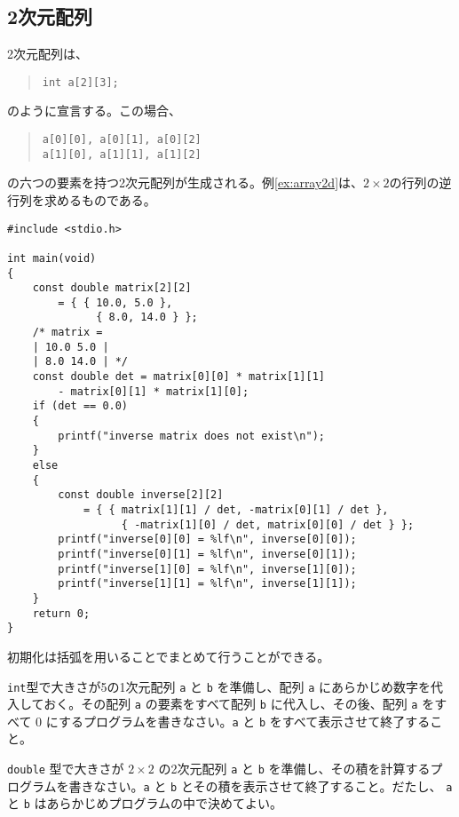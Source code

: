 \subsection{2次元配列}
2次元配列は、
\begin{quote}
    \begin{verbatim}
int a[2][3];
\end{verbatim}
\end{quote}
のように宣言する。この場合、
\begin{quote}
    \begin{verbatim}
a[0][0], a[0][1], a[0][2]
a[1][0], a[1][1], a[1][2]
\end{verbatim}
\end{quote}
の六つの要素を持つ2次元配列が生成される。例\ref{ex:array2d}は、\(2 \times 2\)の行列の逆行列を求めるものである。
\begin{reidai}\label{ex:array2d}
    \begin{verbatim}
#include <stdio.h>

int main(void)
{
    const double matrix[2][2]
        = { { 10.0, 5.0 },
              { 8.0, 14.0 } };
    /* matrix =
    | 10.0 5.0 |
    | 8.0 14.0 | */
    const double det = matrix[0][0] * matrix[1][1]
        - matrix[0][1] * matrix[1][0];
    if (det == 0.0)
    {
        printf("inverse matrix does not exist\n");
    }
    else
    {
        const double inverse[2][2]
            = { { matrix[1][1] / det, -matrix[0][1] / det },
                  { -matrix[1][0] / det, matrix[0][0] / det } };
        printf("inverse[0][0] = %lf\n", inverse[0][0]);
        printf("inverse[0][1] = %lf\n", inverse[0][1]);
        printf("inverse[1][0] = %lf\n", inverse[1][0]);
        printf("inverse[1][1] = %lf\n", inverse[1][1]);
    }
    return 0;
}
\end{verbatim}
\end{reidai}
初期化は括弧を用いることでまとめて行うことができる。

\begin{renshuu}\label{prob:3-1}
    \texttt{int}型で大きさが5の1次元配列 \texttt{a} と \texttt{b} を準備し、配列 \texttt{a} にあらかじめ数字を代入しておく。その配列 \texttt{a} の要素をすべて配列 \texttt{b} に代入し、その後、配列 \texttt{a} をすべて 0 にするプログラムを書きなさい。\texttt{a} と \texttt{b} をすべて表示させて終了すること。
\end{renshuu}

\begin{renshuu}\label{prob:3-2}
    \texttt{double} 型で大きさが \(2\times2\) の2次元配列 \texttt{a} と \texttt{b} を準備し、その積を計算するプログラムを書きなさい。\texttt{a} と \texttt{b} とその積を表示させて終了すること。だたし、 \texttt{a} と \texttt{b} はあらかじめプログラムの中で決めてよい。
\end{renshuu}

